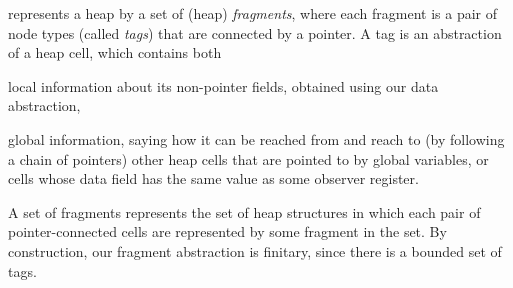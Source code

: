 \begin{itemize}
represents a heap by a set of (heap) {\em fragments}, where each fragment is
a pair of node types (called {\em tags}) that are connected by a pointer.
A tag is an abstraction of a heap cell, which contains both 
\begin{inparaenum}[(i)]
\item
  local information about its non-pointer fields, obtained
   using our data abstraction,
 \item
   global information, saying how
it can be reached from and reach to (by following a chain of pointers)
other heap cells that are pointed to by global variables, or cells whose
    data field has  the same value as some observer register.
\end{inparaenum}
A set of fragments represents the set of heap structures in which each
pair of pointer-connected cells are represented by some fragment in the set.
By construction, our fragment abstraction is finitary, since there is
a bounded set of tags.
\end{itemize}

